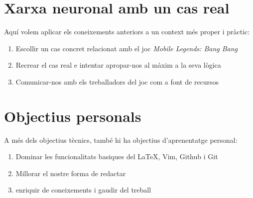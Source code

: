 \section{Xarxa neuronal amb un cas real}\label{sec:Xarxa neuronal amb un cas real}
Aquí volem aplicar els coneixements anteriors a un context més proper i pràctic:
\begin{enumerate}[label=\alph*)]
\item Escollir un cas concret relacionat amb el joc \textit{Mobile Legends: Bang Bang}
\item Recrear el cas real e intentar apropar-nos al màxim a la seva lògica
\item Comunicar-nos amb els treballadors del joc com a font de recursos
\end{enumerate}


\section{Objectius personals}\label{sec:Objectius personals}
A més dels objectius tècnics, també hi ha objectius d’aprenentatge personal:
\begin{enumerate}[label=\alph*)]
\item Dominar les funcionalitats basiques del \LaTeX, Vim, Github i Git
\item Millorar el nostre forma de redactar
\item enriquir de coneixements i gaudir del treball
\end{enumerate}



